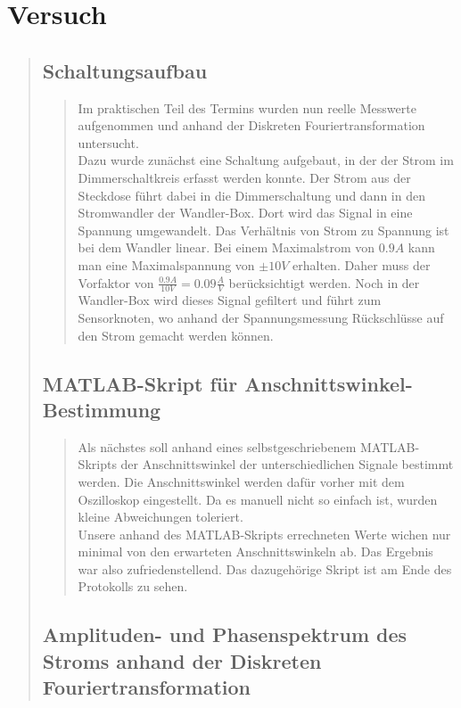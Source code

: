 \section{Versuch}
\begin{quote}

	\subsection{Schaltungsaufbau}
	\begin{quote}
	Im praktischen Teil des Termins wurden nun reelle Messwerte aufgenommen und
	anhand der Diskreten Fouriertransformation untersucht.\\
	Dazu wurde zunächst eine Schaltung aufgebaut, in der der Strom im
	Dimmerschaltkreis erfasst werden konnte. Der Strom aus der Steckdose führt
	dabei in die Dimmerschaltung und dann in den Stromwandler der Wandler-Box. Dort
	wird das Signal in eine Spannung umgewandelt. Das Verhältnis von Strom zu
	Spannung ist bei dem Wandler linear. Bei einem Maximalstrom von $0.9 A$ kann
	man eine Maximalspannung von $\pm 10 V$ erhalten. Daher muss der Vorfaktor von
	$\frac{0.9 A}{10 V} = 0.09 \frac{A}{V}$ berücksichtigt werden. Noch in der
	Wandler-Box wird dieses Signal gefiltert und führt zum Sensorknoten, wo anhand
	der Spannungsmessung Rückschlüsse auf den Strom gemacht werden können.
	\end{quote}
	
	\subsection{MATLAB-Skript für Anschnittswinkel-Bestimmung}
	\begin{quote}	
	Als nächstes soll anhand eines selbstgeschriebenem MATLAB-Skripts der
	Anschnittswinkel der unterschiedlichen Signale bestimmt werden. Die
	Anschnittswinkel werden dafür vorher mit dem Oszilloskop eingestellt. Da es
	manuell nicht so einfach ist, wurden kleine Abweichungen toleriert.\\ 
	
	Unsere anhand des MATLAB-Skripts errechneten Werte wichen nur minimal von den
	erwarteten Anschnittswinkeln ab. Das Ergebnis war also zufriedenstellend. 
    Das dazugehörige Skript ist am Ende des Protokolls zu sehen.
   	\end{quote}
	
	\subsection{Amplituden- und Phasenspektrum des Stroms anhand der Diskreten
	Fouriertransformation}
	\begin{quote}
	\end{quote}
	

\end{quote}
